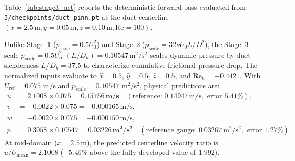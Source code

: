 \documentclass[11pt,a4paper]{article}
\begin{document}
Table~\ref{tab:stage3_act} reports the deterministic forward pass evaluated from \texttt{3/checkpoints/duct\_pinn.pt} at the duct centerline $(x=2.5\,\text{m}, y=0.05\,\text{m}, z=0.10\,\text{m}, \mathrm{Re}=100)$.
\begin{table}[H]
\centering
{}
\caption{Deterministic layer-by-layer forward pass evaluated at $(x=2.5\,\text{m}, y=0.05\,\text{m}, z=0.10\,\text{m}, \mathrm{Re}=100)$. Normalized input vector: $[0.5000, 0.5000, 0.5000, -0.4421]^{\mathsf T}$. Checkpoint SHA256: \texttt{fa39850d5892dc98...}.}
\label{tab:stage3_act}
\end{table}
Unlike Stage~1 ($p_{\mathrm{scale}} = 0.5 U_0^2$) and Stage~2 ($p_{\mathrm{scale}} = 32\nu U_0 L / D^2$), the Stage~3 scale $p_{\mathrm{scale}} = 0.5 U_{\mathrm{ref}}^2 (L / D_h) = 0.10547\,\text{m}^2/\text{s}^2$ scales dynamic pressure by duct slenderness $L / D_h = 37.5$ to characterize cumulative frictional pressure drop. The normalized inputs evaluate to $\hat{x}=0.5$, $\hat{y}=0.5$, $\hat{z}=0.5$, and $\mathrm{Re}_n=-0.4421$. With $U_{\mathrm{ref}} = 0.075$ m/s and $p_{\mathrm{scale}} = 0.10547$ m$^2$/s$^2$, physical predictions are:
\begin{align}
u &= 2.1008 \times 0.075 = \mathbf{0.15756\,\text{m/s}} \quad (\text{reference: } 0.14947\,\text{m/s}, \text{ error } 5.41\%), \\
v &= -0.0022 \times 0.075 = -0.000165\,\text{m/s}, \\
w &= -0.0020 \times 0.075 = -0.000150\,\text{m/s}, \\
p &= 0.3058 \times 0.10547 = \mathbf{0.03226\,\text{m}^2/\text{s}^2} \quad (\text{reference gauge: } 0.03267\,\text{m}^2/\text{s}^2, \text{ error } 1.27\%).
\end{align}
At mid-domain ($x=2.5\,\text{m}$), the predicted centerline velocity ratio is $u/U_{\mathrm{mean}} = 2.1008$ ($+5.46\%$ above the fully developed value of $1.992$).
\end{document}
